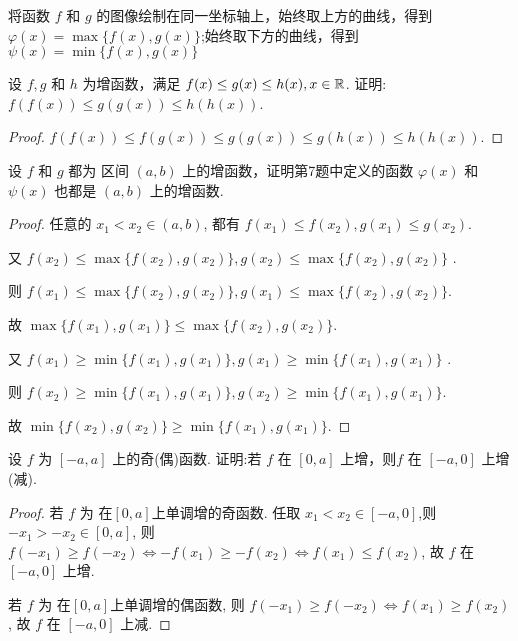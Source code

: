 \begin{solve}
    将函数 $f$ 和 $g$ 的图像绘制在同一坐标轴上，始终取上方的曲线，得到 $\varphi(x)=\max\{f(x),g(x)\}$;始终取下方的曲线，得到 $\psi(x)=\min\{f(x),g(x)\}$ 
\end{solve}

\begin{practice}
    设 $f,g$ 和 $h$ 为增函数，满足 $f(x)\le g(x)\le h(x),x\in \mathbb{R}$. 证明: $f(f(x))\le g(g(x)) \le h(h(x))$.
\end{practice}

\begin{proof}
    $f(f(x))\le f(g(x))\le g(g(x)) \le g(h(x)) \le h(h(x)).$
\end{proof}

\begin{practice}
    设  $f$ 和 $g$  都为 区间 $(a,b)$ 上的增函数，证明第7题中定义的函数 $\varphi(x)$ 和 $\psi(x)$ 也都是 $(a,b)$ 上的增函数.
\end{practice}

\begin{proof}
    任意的 $x_1<x_2\in (a,b)$, 都有 $f(x_1)\le f(x_2),g(x_1)\le g(x_2)$. 
    
    又 $f(x_2)\le \max\{f(x_2),g(x_2)\},g(x_2)\le \max\{f(x_2),g(x_2)\}$ . 
    
    则 $f(x_1)\le \max\{f(x_2),g(x_2)\},g(x_1)\le \max\{f(x_2),g(x_2)\}$. 
    
    故 $\max\{f(x_1),g(x_1)\}\le \max\{f(x_2),g(x_2)\}$.

    又 $f(x_1)\ge \min\{f(x_1),g(x_1)\},g(x_1)\ge \min\{f(x_1),g(x_1)\}$ . 
    
    则 $f(x_2)\ge \min\{f(x_1),g(x_1)\},g(x_2)\ge \min\{f(x_1),g(x_1)\}$. 
    
    故 $\min\{f(x_2),g(x_2)\}\ge \min\{f(x_1),g(x_1)\}$.
\end{proof}

\begin{practice}
    设 $f$ 为 $[-a,a]$ 上的奇(偶)函数. 证明:若 $f$ 在 $[0,a]$ 上增，则$f$ 在 $[-a,0]$ 上增(减).
\end{practice}

\begin{proof}
    若 $f$ 为 在$[0,a]$上单调增的奇函数. 任取 $x_1<x_2\in [-a,0]$,则 $-x_1>-x_2\in [0,a]$, 则 $f(-x_1)\ge f(-x_2)\iff -f(x_1) \ge  -f(x_2) \iff f(x_1) \le f(x_2) $, 故 $f$ 在 $[-a,0]$ 上增.

    若 $f$ 为 在$[0,a]$上单调增的偶函数, 则 $f(-x_1)\ge f(-x_2)\iff f(x_1) \ge  f(x_2)$, 故 $f$ 在 $[-a,0]$ 上减.
\end{proof}

